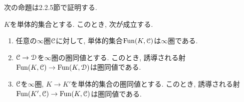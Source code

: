 \documentclass[uplatex, a4paper, 14Q, dvipdfmx]{jsreport}
\begin{document}
次の命題は2.2.5節で証明する.

\begin{proposition} \label{prop.1.2.7.3}
  $K$を単体的集合とする. 
  このとき, 次が成立する. 
  \begin{enumerate}
    \item 任意の$\infty$圏$\mathcal{C}$に対して, 単体的集合$\mathrm{Fun}(K,\mathcal{C})$は$\infty$圏である.
    \item $\mathcal{C} \to \mathcal{D}$を$\infty$圏の圏同値とする. 
    このとき, 誘導される射$\mathrm{Fun}(K,\mathcal{C}) \to \mathrm{Fun}(K,\mathcal{D})$は圏同値である. 
    \item $\mathcal{C}$を$\infty$圏, $K \to K'$を単体的集合の圏同値とする. 
    このとき, 誘導される射$\mathrm{Fun}(K',\mathcal{C}) \to \mathrm{Fun}(K,\mathcal{C})$は圏同値である. 
  \end{enumerate}
\end{proposition}
\end{document}
